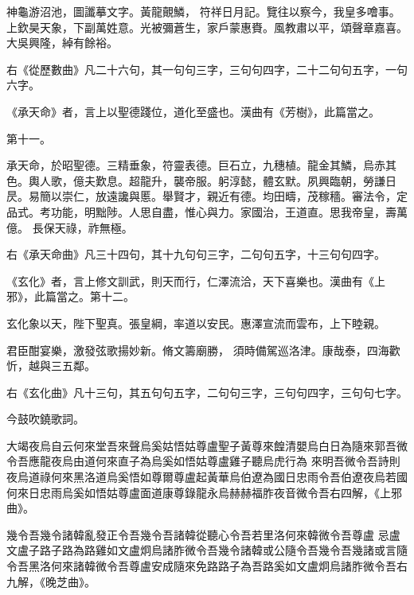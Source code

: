 \begin{pinyinscope}
 神龜游沼池，圖讖摹文字。黃龍覿鱗，
 符祥日月記。覽往以察今，我皇多噲事。上欽昊天象，下副萬姓意。光被彌蒼生，家戶蒙惠賚。風教肅以平，頌聲章嘉喜。大吳興隆，綽有餘裕。



 右《從歷數曲》凡二十六句，其一句句三字，三句句四字，二十二句句五字，一句六字。



 《承天命》者，言上以聖德踐位，道化至盛也。漢曲有《芳樹》，此篇當之。



 第十一。



 承天命，於昭聖德。三精垂象，符靈表德。巨石立，九穗植。龍金其鱗，烏赤其色。輿人歌，億夫歎息。超龍升，襲帝服。躬淳懿，體玄默。夙興臨朝，勞謙日昃。易簡以崇仁，放遠讒與慝。舉賢才，親近有德。均田疇，茂稼穡。審法令，定品式。考功能，明黜陟。人思自盡，惟心與力。家國治，王道直。思我帝皇，壽萬億。
 長保天祿，祚無極。



 右《承天命曲》凡三十四句，其十九句句三字，二句句五字，十三句句四字。



 《玄化》者，言上修文訓武，則天而行，仁澤流洽，天下喜樂也。漢曲有《上邪》，此篇當之。第十二。



 玄化象以天，陛下聖真。張皇綱，率道以安民。惠澤宣流而雲布，上下睦親。



 君臣酣宴樂，激發弦歌揚妙新。脩文籌廟勝，
 須時備駕巡洛津。康哉泰，四海歡忻，越與三五鄰。



 右《玄化曲》凡十三句，其五句句五字，二句句三字，三句句四字，三句句七字。


今鼓吹鐃歌詞。



 大竭夜烏自云何來堂吾來聲烏奚姑悟姑尊盧聖子黃尊來餭清嬰烏白日為隨來郭吾微令吾應龍夜烏由道何來直子為烏奚如悟姑尊盧雞子聽烏虎行為
 來明吾微令吾詩則夜烏道祿何來黑洛道烏奚悟如尊爾尊盧起黃華烏伯遼為國日忠雨令吾伯遼夜烏若國何來日忠雨烏奚如悟姑尊盧面道康尊錄龍永烏赫赫福胙夜音微令吾右四解，《上邪曲》。


幾令吾幾令諸韓亂發正令吾幾令吾諸韓從聽心令吾若里洛何來韓微令吾尊盧
 忌盧文盧子路子路為路雞如文盧炯烏諸胙微令吾幾令諸韓或公隨令吾幾令吾幾諸或言隨令吾黑洛何來諸韓微令吾尊盧安成隨來免路路子為吾路奚如文盧炯烏諸胙微令吾右九解，《晚芝曲》。




\end{pinyinscope}
